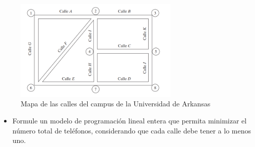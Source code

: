 \documentclass[letterpaper]{article}
\begin{document}
\begin{figure}[ht]
\centering
\includegraphics[width=0.7\textwidth]{images/img_1.png}
\caption{Mapa de las calles del campus de la Universidad de Arkansas}
\label{fig_1}
\end{figure}
\begin{itemize}
\item Formule un modelo de programación lineal entera que permita minimizar el número total de teléfonos, considerando que cada calle debe tener a lo menos uno.
\end{itemize}
\end{document}

